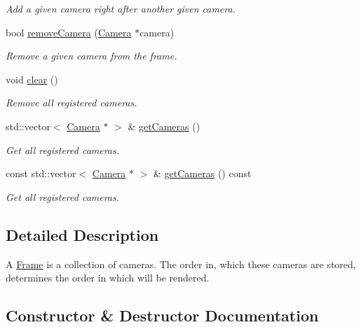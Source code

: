 \begin{DoxyCompactItemize}
\begin{DoxyCompactList}\small\item\em Add a given camera right after another given camera. \end{DoxyCompactList}\item 
bool \mbox{\hyperlink{classec_1_1_frame_a7a93ec89a809f5b7e685c5adc73d6cda}{remove\+Camera}} (\mbox{\hyperlink{classec_1_1_camera}{Camera}} $\ast$camera)
\begin{DoxyCompactList}\small\item\em Remove a given camera from the frame. \end{DoxyCompactList}\item 
void \mbox{\hyperlink{classec_1_1_frame_ae9896c9acff0f468a750d9eae784b23b}{clear}} ()
\begin{DoxyCompactList}\small\item\em Remove all registered cameras. \end{DoxyCompactList}\item 
std\+::vector$<$ \mbox{\hyperlink{classec_1_1_camera}{Camera}} $\ast$ $>$ \& \mbox{\hyperlink{classec_1_1_frame_a942b4c8826f6169703ff6b19ae60be8c}{get\+Cameras}} ()
\begin{DoxyCompactList}\small\item\em Get all registered cameras. \end{DoxyCompactList}\item 
const std\+::vector$<$ \mbox{\hyperlink{classec_1_1_camera}{Camera}} $\ast$ $>$ \& \mbox{\hyperlink{classec_1_1_frame_a80aefbcba8339fabc3b4aa2b8b21a8bf}{get\+Cameras}} () const
\begin{DoxyCompactList}\small\item\em Get all registered cameras. \end{DoxyCompactList}\end{DoxyCompactItemize}


\subsection{Detailed Description}
A \mbox{\hyperlink{classec_1_1_frame}{Frame}} is a collection of cameras. The order in, which these cameras are stored, determines the order in which will be rendered. 

\subsection{Constructor \& Destructor Documentation}
\mbox{\label{classec_1_1_frame_a80ed1da85818f646b6b80fb6c8a6c2a6}} 
